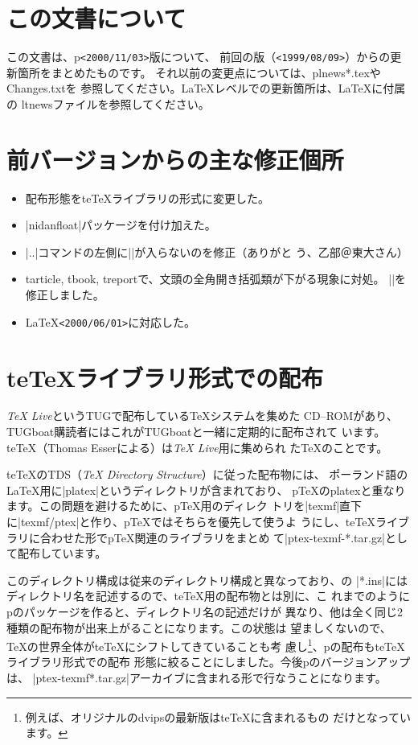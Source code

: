 \documentclass{plnews}
\author{中野 賢（\texttt{<ken-na at ascii.co.jp>}）
     \& 富樫 秀昭（\texttt{<hideak-t at ascii.co.jp>}）
}
\begin{document}
\maketitle

\section{この文書について}
この文書は、p\LaTeXe{}\texttt{<2000/11/03>}版について、
前回の版（\texttt{<1999/08/09>}）からの更新箇所をまとめたものです。
それ以前の変更点については、\textsf{plnews*.tex}やChanges.txtを
参照してください。\LaTeX{}レベルでの更新箇所は、\LaTeX{}に付属の
ltnewsファイルを参照してください。

\section{前バージョンからの主な修正個所}
\begin{itemize}
\item 配布形態をte\TeX{}ライブラリの形式に変更した。
\item |nidanfloat|パッケージを付け加えた。
\item |\text..|コマンドの左側に|\xkanjiskip|が入らないのを修正（ありがと
う、乙部＠東大さん）
\item tarticle, tbook, treportで、文頭の全角開き括弧類が下がる現象に対処。
|\adjustbaseline|を修正しました。
\item \LaTeX \texttt{<2000/06/01>}に対応した。
\end{itemize}


\section{te\TeX{}ライブラリ形式での配布}
\textit{\TeX{} Live}というTUGで配布している\TeX{}システムを集めた
CD--ROMがあり、TUGboat購読者にはこれがTUGboatと一緒に定期的に配布されて
います。te\TeX{}（Thomas Esserによる）は\textit{\TeX{} Live}用に集められ
た\TeX{}のことです。

te\TeX{}のTDS（\textit{\TeX{} Directory Structure}）に従った配布物には、
ポーランド語の\LaTeX{}用に|platex|というディレクトリが含まれており、
p\TeX{}のplatexと重なります。この問題を避けるために、p\TeX{}用のディレク
トリを|texmf|直下に|texmf/ptex|と作り、p\TeX{}ではそちらを優先して使うよ
うにし、te\TeX{}ライブラリに合わせた形でp\TeX{}関連のライブラリをまとめ
て|ptex-texmf-*.tar.gz|として配布しています。

このディレクトリ構成は従来のディレクトリ構成と異なっており、\LaTeXe{}の
|*.ins|にはディレクトリ名を記述するので、te\TeX{}用の配布物とは別に、こ
れまでのようにp\LaTeXe{}のパッケージを作ると、ディレクトリ名の記述だけが
異なり、他は全く同じ2種類の配布物が出来上がることになります。この状態は
望ましくないので、\TeX{}の世界全体がte\TeX{}にシフトしてきていることも考
慮し\footnote{例えば、オリジナルのdvipsの最新版はte\TeX{}に含まれるもの
だけとなっています。}、p\LaTeXe{}の配布もte\TeX{}ライブラリ形式での配布
形態に絞ることにしました。今後p\LaTeXe{}のバージョンアップは、
|ptex-texmf*.tar.gz|アーカイブに含まれる形で行なうことになります。
\end{document}
